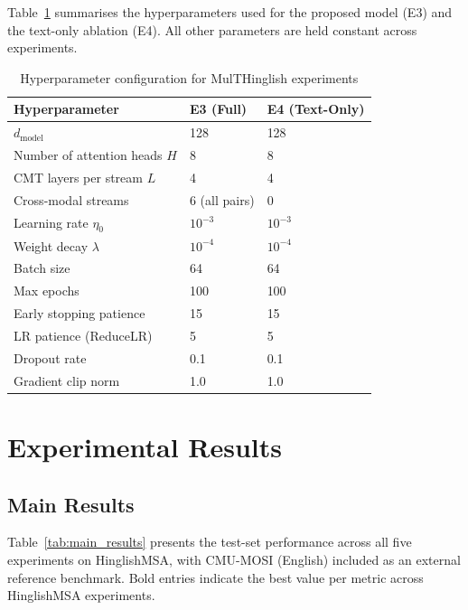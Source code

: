 Table~\ref{tab:hparams} summarises the hyperparameters used for the proposed model (E3) and the text-only ablation (E4). All other parameters are held constant across experiments.

\begin{table}[ht]
\centering
\caption{Hyperparameter configuration for MulTHinglish experiments}
\label{tab:hparams}
\renewcommand{\arraystretch}{1.3}
\begin{tabular}{lll}
\toprule
\textbf{Hyperparameter} & \textbf{E3 (Full)} & \textbf{E4 (Text-Only)} \\
\midrule
$d_{\text{model}}$              & 128          & 128 \\
Number of attention heads $H$   & 8            & 8 \\
CMT layers per stream $L$       & 4            & 4 \\
Cross-modal streams             & 6 (all pairs)& 0 \\
Learning rate $\eta_0$          & $10^{-3}$    & $10^{-3}$ \\
Weight decay $\lambda$          & $10^{-4}$    & $10^{-4}$ \\
Batch size                      & 64           & 64 \\
Max epochs                      & 100          & 100 \\
Early stopping patience         & 15           & 15 \\
LR patience (ReduceLR)         & 5            & 5 \\
Dropout rate                    & 0.1          & 0.1 \\
Gradient clip norm              & 1.0          & 1.0 \\
\bottomrule
\end{tabular}
\end{table}

\section{Experimental Results}

\subsection{Main Results}

Table~\ref{tab:main_results} presents the test-set performance across all five experiments on HinglishMSA, with CMU-MOSI (English) included as an external reference benchmark. Bold entries indicate the best value per metric across HinglishMSA experiments.

